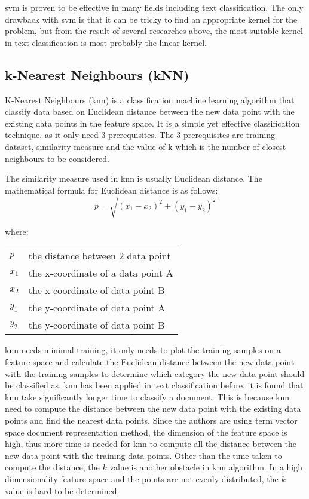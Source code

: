 \Ac{svm} is proven to be effective in many fields including text classification. The only drawback with \ac{svm} is that it can be tricky to find an appropriate kernel for the problem, but from the result of several researches above, the most suitable kernel in text classification is most probably the linear kernel.\\


\subsection{k-Nearest Neighbours (kNN)}
K-Nearest Neighbours (\ac{knn}) is a classification machine learning algorithm that classify data based on Euclidean distance between the new data point with the existing data points in the feature space. It is a simple yet effective classification technique, as it only need 3 prerequisites. The 3 prerequisites are training dataset, similarity measure and the value of k which is the number of closest neighbours to be considered. 

The similarity measure used in \ac{knn} is usually Euclidean distance. The mathematical formula for Euclidean distance is as follows:
\begin{equation}
p = \sqrt{(x_{1} - x_{2})^{2} + (y_{1} - y_{2})^{2}}
\end{equation}

where:
\begin{center}
	\begin{tabular}{l @{ $=$ } l}
		$p$ & the distance between 2 data point\\
		$x_{1}$ & the x-coordinate of a data point A\\
		$x_{2}$ & the x-coordinate of data point B\\
		$y_{1}$ & the y-coordinate of data point A\\
		$y_{2}$ & the y-coordinate of data point B\\
	\end{tabular}
\end{center}
	

\Ac{knn} needs minimal training, it only needs to plot the training samples on a feature space and calculate the Euclidean distance between the new data point with the training samples to determine which category the new data point should be classified as. \Ac{knn} has been applied in text classification before, it is found that \ac{knn} take significantly longer time to classify a document. This is because \ac{knn} need to compute the distance between the new data point with the existing data points and find the nearest data points. Since the authors are using term vector space document representation method, the dimension of the feature space is high, thus more time is needed for \ac{knn} to compute all the distance between the new data point with the training data points. Other than the time taken to compute the distance, the $k$ value is another obstacle in \ac{knn} algorithm. In a high dimensionality feature space and the points are not evenly distributed, the $k$ value is hard to be determined.

